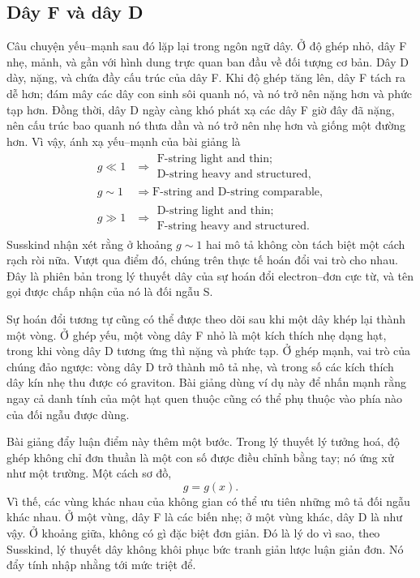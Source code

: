\subsection{Dây F và dây D}

Câu chuyện yếu--mạnh sau đó lặp lại trong ngôn ngữ dây. Ở độ ghép nhỏ, dây F nhẹ, mảnh, và gần với hình dung trực quan ban đầu về đối tượng cơ bản. Dây D dày, nặng, và chứa đầy cấu trúc của dây F. Khi độ ghép tăng lên, dây F tách ra dễ hơn; đám mây các dây con sinh sôi quanh nó, và nó trở nên nặng hơn và phức tạp hơn. Đồng thời, dây D ngày càng khó phát xạ các dây F giờ đây đã nặng, nên cấu trúc bao quanh nó thưa dần và nó trở nên nhẹ hơn và giống một đường hơn. Vì vậy, ánh xạ yếu--mạnh của bài giảng là
\begin{align}
g \ll 1
&\Rightarrow
\begin{gathered}
\text{F-string light and thin;}\\
\text{D-string heavy and structured},
\end{gathered}\\
g \sim 1
&\Rightarrow
\text{F-string and D-string comparable},\\
g \gg 1
&\Rightarrow
\begin{gathered}
\text{D-string light and thin;}\\
\text{F-string heavy and structured}.
\end{gathered}
\end{align}
Susskind nhận xét rằng ở khoảng \(g\sim 1\) hai mô tả không còn tách biệt một cách rạch ròi nữa. Vượt qua điểm đó, chúng trên thực tế hoán đổi vai trò cho nhau. Đây là phiên bản trong lý thuyết dây của sự hoán đổi electron--đơn cực từ, và tên gọi được chấp nhận của nó là đối ngẫu S.

Sự hoán đổi tương tự cũng có thể được theo dõi sau khi một dây khép lại thành một vòng. Ở ghép yếu, một vòng dây F nhỏ là một kích thích nhẹ dạng hạt, trong khi vòng dây D tương ứng thì nặng và phức tạp. Ở ghép mạnh, vai trò của chúng đảo ngược: vòng dây D trở thành mô tả nhẹ, và trong số các kích thích dây kín nhẹ thu được có graviton. Bài giảng dùng ví dụ này để nhấn mạnh rằng ngay cả danh tính của một hạt quen thuộc cũng có thể phụ thuộc vào phía nào của đối ngẫu được dùng.

Bài giảng đẩy luận điểm này thêm một bước. Trong lý thuyết lý tưởng hoá, độ ghép không chỉ đơn thuần là một con số được điều chỉnh bằng tay; nó ứng xử như một trường. Một cách sơ đồ,
\begin{equation}
g = g(x).
\end{equation}
Vì thế, các vùng khác nhau của không gian có thể ưu tiên những mô tả đối ngẫu khác nhau. Ở một vùng, dây F là các biến nhẹ; ở một vùng khác, dây D là như vậy. Ở khoảng giữa, không có gì đặc biệt đơn giản. Đó là lý do vì sao, theo Susskind, lý thuyết dây không khôi phục bức tranh giản lược luận giản đơn. Nó đẩy tính nhập nhằng tới mức triệt để.

